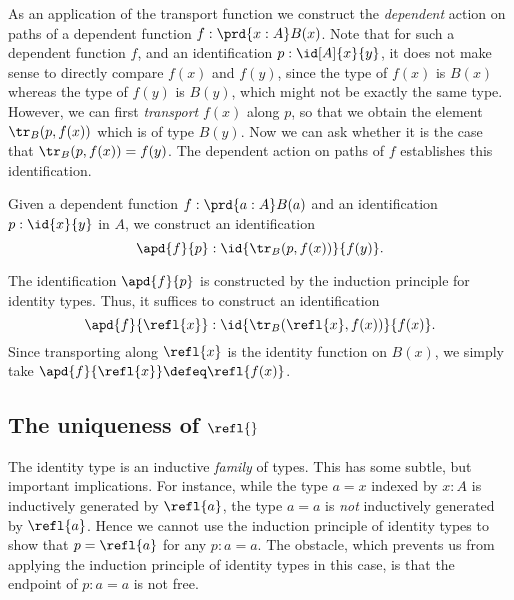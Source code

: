 As an application of the transport function we construct the \emph{dependent} action on paths of a dependent function $f:\prd{x:A}B(x)$. Note that for such a dependent function $f$, and an identification $p:\id[A]{x}{y}$, it does not make sense to directly compare $f(x)$ and $f(y)$, since the type of $f(x)$ is $B(x)$ whereas the type of $f(y)$ is $B(y)$, which might not be exactly the same type. However, we can first \emph{transport} $f(x)$ along $p$, so that we obtain the element $\tr_B(p,f(x))$ which is of type $B(y)$. Now we can ask whether it is the case that $\tr_B(p,f(x))=f(y)$. The dependent action on paths of $f$ establishes this identification.

\begin{defn}\label{defn:apd}
Given a dependent function $f:\prd{a:A}B(a)$ and an identification $p:\id{x}{y}$ in $A$, we construct an identification
\begin{equation*}
\apd{f}{p} : \id{\tr_B(p,f(x))}{f(y)}.
\end{equation*}
\end{defn}

\begin{constr}
The identification $\apd{f}{p}$ is constructed by the induction principle for identity types. Thus, it suffices to construct an identification
\begin{equation*}
\apd{f}{\refl{x}}:\id{\tr_B(\refl{x},f(x))}{f(x)}.
\end{equation*}
Since transporting along $\refl{x}$ is the identity function on $B(x)$, we simply take $\apd{f}{\refl{x}}\defeq\refl{f(x)}$. 
\end{constr}

\subsection{The uniqueness of \texorpdfstring{$\refl{}$}{refl}}\label{sec:refl-unique}%

The identity type is an inductive \emph{family} of types. This has some subtle, but important implications. For instance, while the type $a=x$ indexed by $x:A$ is inductively generated by $\refl{a}$, the type $a=a$ is \emph{not} inductively generated by $\refl{a}$. Hence we cannot use the induction principle of identity types to show that $p=\refl{a}$ for any $p:a=a$. The obstacle, which prevents us from applying the induction principle of identity types in this case, is that the endpoint of $p:a=a$ is not free.

